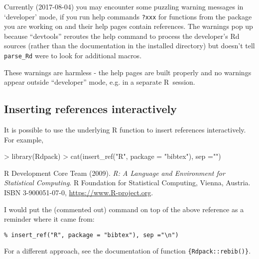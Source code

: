 \documentclass[12pt,a4paper]{article}
\begin{document}
Currently (2017-08-04) you may encounter some puzzling warning messages in `developer' mode,
if you run help commands \verb+?xxx+ for functions from the package you are working on and
their help pages contain references. The warnings pop up because ``devtools'' reroutes the
help command to process the developer's Rd sources (rather than the documentation in the
installed directory) but doesn't tell \verb+parse_Rd+ were to look for additional macros.

These warnings are harmless - the help pages are built properly and no warnings appear
outside ``developer'' mode, e.g. in a separate R~session.


\subsection*{Inserting references interactively}
\label{sec:insert-refer-inter}

It is possible to use the underlying R function to insert references interactively.
For example,
\begin{Schunk}
\begin{Sinput}
> library(Rdpack)
> cat(insert_ref("R", package = "bibtex"), sep ="\n")
\end{Sinput}
\begin{Soutput}
R Development Core Team (2009).
\emph{R: A Language and Environment for Statistical Computing}.
R Foundation for Statistical Computing, Vienna, Austria.
ISBN 3-900051-07-0, \url{https://www.R-project.org}.
\end{Soutput}
\end{Schunk}

I would put the (commented out) command on top of the above reference as a reminder where it
came from:
\begin{verbatim}
% insert_ref("R", package = "bibtex"), sep ="\n")
\end{verbatim}

For a different approach, see the documentation of function \verb+{Rdpack::rebib()}+.
\end{document}
